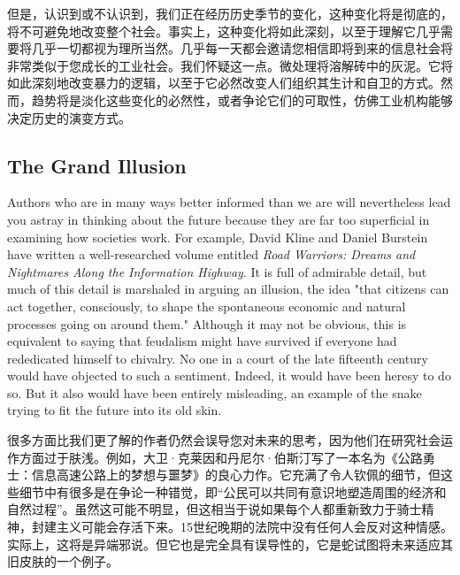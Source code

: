 \begin{Parallel}{97mm}{72mm}
  \ParallelRText
  {但是，认识到或不认识到，我们正在经历历史季节的变化，这种变化将是彻底的，将不可避免地改变整个社会。事实上，这种变化将如此深刻，以至于理解它几乎需要将几乎一切都视为理所当然。几乎每一天都会邀请您相信即将到来的信息社会将非常类似于您成长的工业社会。我们怀疑这一点。微处理将溶解砖中的灰泥。它将如此深刻地改变暴力的逻辑，以至于它必然改变人们组织其生计和自卫的方式。然而，趋势将是淡化这些变化的必然性，或者争论它们的可取性，仿佛工业机构能够决定历史的演变方式。}
  \ParallelPar

  \subsection{The Grand Illusion}

  \ParallelLText
  {Authors who are in many ways better informed than we are will nevertheless lead you astray in thinking about the future because they are far too superficial in examining how societies work. For example, David Kline and Daniel Burstein have written a well-researched volume entitled \emph{Road Warriors: Dreams and Nightmares Along the Information Highway}. It is full of admirable detail, but much of this detail is marshaled in arguing an illusion, the idea "that citizens can act together, consciously, to shape the spontaneous economic and natural processes going on around them." Although it may not be obvious, this is equivalent to saying that feudalism might have survived if everyone had rededicated himself to chivalry. No one in a court of the late fifteenth century would have objected to such a sentiment. Indeed, it would have been heresy to do so. But it also would have been entirely misleading, an example of the snake trying to fit the future into its old skin.}
  
  \ParallelRText
  {很多方面比我们更了解的作者仍然会误导您对未来的思考，因为他们在研究社会运作方面过于肤浅。例如，大卫·克莱因和丹尼尔·伯斯汀写了一本名为《公路勇士：信息高速公路上的梦想与噩梦》的良心力作。它充满了令人钦佩的细节，但这些细节中有很多是在争论一种错觉，即“公民可以共同有意识地塑造周围的经济和自然过程”。虽然这可能不明显，但这相当于说如果每个人都重新致力于骑士精神，封建主义可能会存活下来。15世纪晚期的法院中没有任何人会反对这种情感。实际上，这将是异端邪说。但它也是完全具有误导性的，它是蛇试图将未来适应其旧皮肤的一个例子。}
  \ParallelPar




\end{Parallel}
